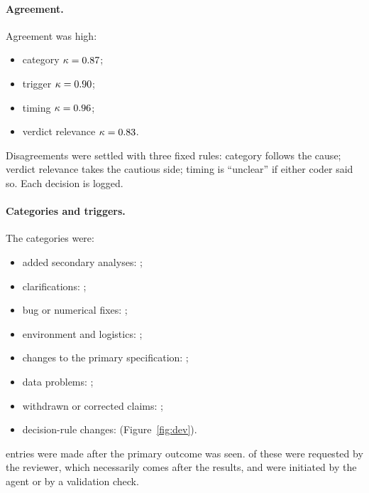 \paragraph{Agreement.} Agreement was high:
\begin{itemize}
\item category $\kappa=0.87{}$;
\item trigger $\kappa=0.90{}$;
\item timing $\kappa=0.96{}$;
\item verdict relevance $\kappa=0.83{}$.
\end{itemize}
Disagreements were settled with three fixed rules: category follows the cause; verdict relevance takes the cautious
side; timing is ``unclear'' if either coder said so. Each decision is logged.

\paragraph{Categories and triggers.} The categories were:
\begin{itemize}
\item added secondary analyses: \DevCFive{};
\item clarifications: \DevCSeven{};
\item bug or numerical fixes: \DevCOne{};
\item environment and logistics: \DevCSix{};
\item changes to the primary specification: \DevCThree{};
\item data problems: \DevCTwo{};
\item withdrawn or corrected claims: \DevCEight{};
\item decision-rule changes: \DevCFour{} (Figure~\ref{fig:dev}).
\end{itemize}
\DevAfter{} entries were made after the primary outcome was seen. \DevAfterReviewer{} of these were requested by the
reviewer, which necessarily comes after the results, and \DevAfterNotReviewer{} were initiated by the agent or by a
validation check.

